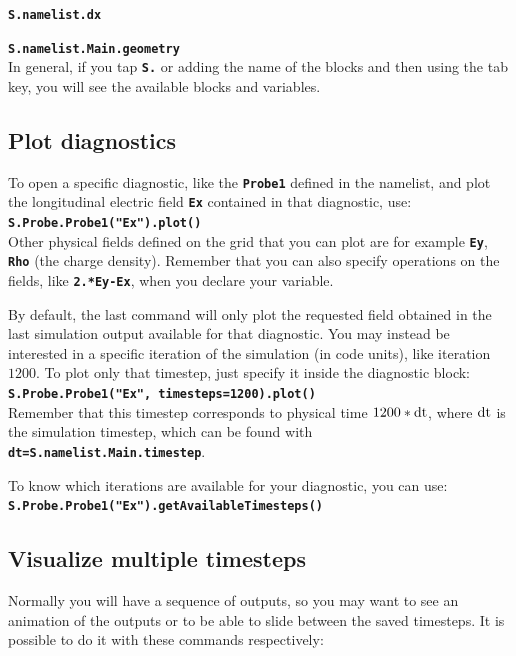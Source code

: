 \documentclass[a4paper,12pt]{extarticle}
\newcommand{\commandline}[1]{\texttt{\textbf{#1}}}
\begin{document}
\begin{appendices}
\commandline{S.namelist.dx}

\commandline{S.namelist.Main.geometry}\\

In general, if you tap \commandline{S.} or adding the name  of the blocks and then using the tab key, you will see the available blocks and variables.

\subsection*{Plot diagnostics}
To open a specific diagnostic, like the \commandline{Probe1} defined in the namelist, and plot the longitudinal electric field \commandline{Ex} contained in that diagnostic, use:\\

\commandline{S.Probe.Probe1("Ex").plot()}\\

Other physical fields defined on the grid that you can plot are for example  \commandline{Ey},  \commandline{Rho} (the charge density). Remember  that you can also specify operations on the fields, like \commandline{2.*Ey-Ex}, when you declare your variable.

By default, the last command will only plot the requested field obtained in the last simulation output available for that diagnostic. You may instead be interested in a specific iteration of the simulation (in code  units), like iteration $1200$. To plot only that timestep, just specify it inside the diagnostic block:\\

\commandline{S.Probe.Probe1("Ex", timesteps=1200).plot()}\\

Remember that this timestep corresponds to physical time $1200*\rm{dt}$, where $\rm{dt}$ is the simulation timestep,  which can be found with \commandline{dt=S.namelist.Main.timestep}.

To know which iterations are available for your diagnostic, you can use:\\

\commandline{S.Probe.Probe1("Ex").getAvailableTimesteps()}

\subsection*{Visualize multiple timesteps}
Normally you will have a sequence of outputs, so you may want to see an animation of the outputs or to be able to slide between the saved timesteps. It is possible to do it with these commands respectively:\\


\end{appendices}
\end{document}
